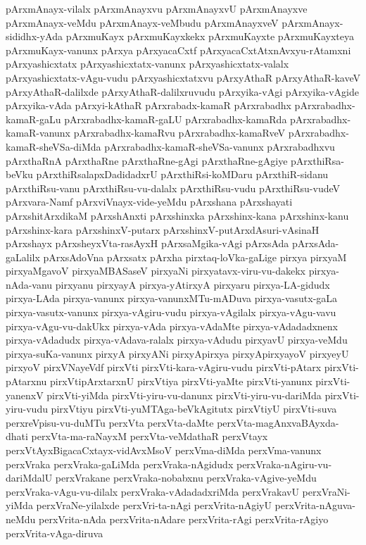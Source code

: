 {pArxmAnayx-vilalx
pArxmAnayxvu
pArxmAnayxvU
pArxmAnayxve
pArxmAnayx-veMdu
pArxmAnayx-veMbudu
pArxmAnayxveV
pArxmAnayx-sididhx-yAda
pArxmuKayx
pArxmuKayxkekx
pArxmuKayxte
pArxmuKayxteya
pArxmuKayx-vanunx
pArxya
pArxyacaCxtf
pArxyacaCxtAtxnAvxyu-rAtamxni
pArxyashicxtatx
pArxyashicxtatx-vanunx
pArxyashicxtatx-valalx
pArxyashicxtatx-vAgu-vudu
pArxyashicxtatxvu
pArxyAthaR
pArxyAthaR-kaveV
pArxyAthaR-dalilxde
pArxyAthaR-dalilxruvudu
pArxyika-vAgi
pArxyika-vAgide
pArxyika-vAda
pArxyi-kAthaR
pArxrabadx-kamaR
pArxrabadhx
pArxrabadhx-kamaR-gaLu
pArxrabadhx-kamaR-gaLU
pArxrabadhx-kamaRda
pArxrabadhx-kamaR-vanunx
pArxrabadhx-kamaRvu
pArxrabadhx-kamaRveV
pArxrabadhx-kamaR-sheVSa-diMda
pArxrabadhx-kamaR-sheVSa-vanunx
pArxrabadhxvu
pArxthaRnA
pArxthaRne
pArxthaRne-gAgi
pArxthaRne-gAgiye
pArxthiRsa-beVku
pArxthiRsalapxDadidadxrU
pArxthiRsi-koMDaru
pArxthiR-sidanu
pArxthiRsu-vanu
pArxthiRsu-vu-dalalx
pArxthiRsu-vudu
pArxthiRsu-vudeV
pArxvara-Namf
pArxviVnayx-vide-yeMdu
pArxshana
pArxshayati
pArxshitArxdikaM
pArxshAnxti
pArxshinxka
pArxshinx-kana
pArxshinx-kanu
pArxshinx-kara
pArxshinxV-putarx
pArxshinxV-putArxdAsuri-vAsinaH
pArxshayx
pArxsheyxVta-rasAyxH
pArxsaMgika-vAgi
pArxsAda
pArxsAda-gaLalilx
pArxsAdoVna
pArxsatx
pArxha
pirxtaq-loVka-gaLige
pirxya
pirxyaM
pirxyaMgavoV
pirxyaMBASaseV
pirxyaNi
pirxyatavx-viru-vu-dakekx
pirxya-nAda-vanu
pirxyanu
pirxyayA
pirxya-yAtirxyA
pirxyaru
pirxya-LA-gidudx
pirxya-LAda
pirxya-vanunx
pirxya-vanunxMTu-mADuva
pirxya-vasutx-gaLa
pirxya-vasutx-vanunx
pirxya-vAgiru-vudu
pirxya-vAgilalx
pirxya-vAgu-vavu
pirxya-vAgu-vu-dakUkx
pirxya-vAda
pirxya-vAdaMte
pirxya-vAdadadxnenx
pirxya-vAdadudx
pirxya-vAdava-ralalx
pirxya-vAdudu
pirxyavU
pirxya-veMdu
pirxya-suKa-vanunx
pirxyA
pirxyANi
pirxyApirxya
pirxyApirxyayoV
pirxyeyU
pirxyoV
pirxVNayeVdf
pirxVti
pirxVti-kara-vAgiru-vudu
pirxVti-pAtarx
pirxVti-pAtarxnu
pirxVtipArxtarxnU
pirxVtiya
pirxVti-yaMte
pirxVti-yanunx
pirxVti-yanenxV
pirxVti-yiMda
pirxVti-yiru-vu-danunx
pirxVti-yiru-vu-dariMda
pirxVti-yiru-vudu
pirxVtiyu
pirxVti-yuMTAga-beVkAgitutx
pirxVtiyU
pirxVti-suva
perxreVpisu-vu-duMTu
perxVta
perxVta-daMte
perxVta-magAnxvaBAyxda-dhati
perxVta-ma-raNayxM
perxVta-veMdathaR
perxVtayx
perxVtAyxBigacaCxtayx-vidAvxMsoV
perxVma-diMda
perxVma-vanunx
perxVraka
perxVraka-gaLiMda
perxVraka-nAgidudx
perxVraka-nAgiru-vu-dariMdalU
perxVrakane
perxVraka-nobabxnu
perxVraka-vAgive-yeMdu
perxVraka-vAgu-vu-dilalx
perxVraka-vAdadadxriMda
perxVrakavU
perxVraNi-yiMda
perxVraNe-yilalxde
perxVri-ta-nAgi
perxVrita-nAgiyU
perxVrita-nAguva-neMdu
perxVrita-nAda
perxVrita-nAdare
perxVrita-rAgi
perxVrita-rAgiyo
perxVrita-vAga-diruva
}
